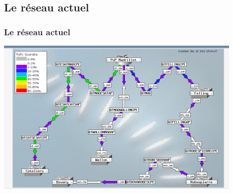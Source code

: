 \documentclass[handout]{beamer}
\begin{document}
	\subsection{Le réseau actuel}
		\begin{frame}
		\frametitle{Le réseau actuel}
		\vspace{-20px}
		\begin{center}
			\includegraphics[width=0.9\textwidth]{images/cacti.png}
		\end{center}
		
		\end{frame}
\end{document}
